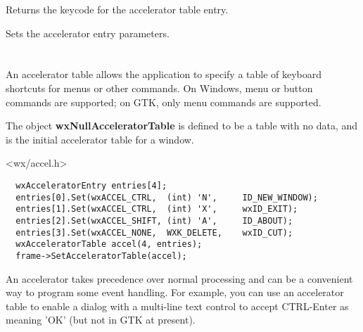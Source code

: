 
Returns the keycode for the accelerator table entry.

\label{wxacceleratorentryset}


Sets the accelerator entry parameters.





\section{}\label{wxacceleratortable}

An accelerator table allows the application to specify a table of keyboard shortcuts for
menus or other commands. On Windows, menu or button commands are supported; on GTK,
only menu commands are supported.

The object {\bf wxNullAcceleratorTable} is defined to be a table with no data, and is the
initial accelerator table for a window.




<wx/accel.h>


{\small%
\begin{verbatim}
  wxAcceleratorEntry entries[4];
  entries[0].Set(wxACCEL_CTRL,  (int) 'N',     ID_NEW_WINDOW);
  entries[1].Set(wxACCEL_CTRL,  (int) 'X',     wxID_EXIT);
  entries[2].Set(wxACCEL_SHIFT, (int) 'A',     ID_ABOUT);
  entries[3].Set(wxACCEL_NONE,  WXK_DELETE,    wxID_CUT);
  wxAcceleratorTable accel(4, entries);
  frame->SetAcceleratorTable(accel);
\end{verbatim}
}


An accelerator takes precedence over normal processing and can be a convenient way to program some event handling.
For example, you can use an accelerator table to enable a dialog with a multi-line text control to
accept CTRL-Enter as meaning 'OK' (but not in GTK at present).

